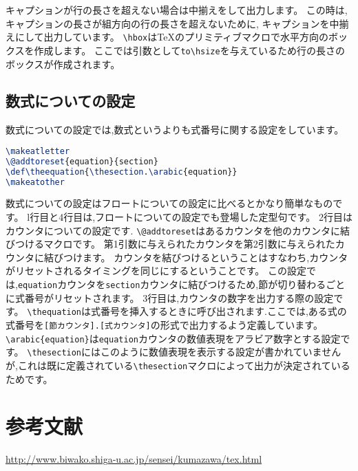 キャプションが行の長さを超えない場合は中揃えをして出力します。
この時は,キャプションの長さが組方向の行の長さを超えないために,
キャプションを中揃えにして出力しています。
\verb|\hbox|は{\TeX}のプリミティブマクロで水平方向のボックスを作成します。
ここでは引数として\verb|to\hsize|を与えているため行の長さのボックスが作成されます。

\subsection{数式についての設定}

数式についての設定では,数式というよりも式番号に関する設定をしています。
\begin{lstlisting}[caption = 数式についての設定, label = list:eq, language = tex]
\makeatletter
\@addtoreset{equation}{section}
\def\theequation{\thesection.\arabic{equation}}
\makeatother
\end{lstlisting}

数式についての設定はフロートについての設定に比べるとかなり簡単なものです。
l行目と4行目は,フロートについての設定でも登場した定型句です。
2行目はカウンタについての設定です. \verb|\@addtoreset|はあるカウンタを他のカウンタに結びつけるマクロです。
第1引数に与えられたカウンタを第2引数に与えられたカウンタに結びつけます。
カウンタを結びつけるということはすなわち,カウンタがリセットされるタイミングを同じにするということです。
この設定では,\verb|equation|カウンタを\verb|section|カウンタに結びつけるため,節が切り替わるごとに式番号がリセットされます。
3行目は,カウンタの数字を出力する際の設定です。
\verb|\thequation|は式番号を挿入するときに呼び出されます.ここでは,ある式の式番号を\verb|[節カウンタ].[式カウンタ]|の形式で出力するよう定義しています。
\verb|\arabic{equation}|は\verb|equation|カウンタの数値表現をアラビア数字とする設定です。
\verb|\thesection|にはこのように数値表現を表示する設定が書かれていませんが,これは既に定義されている\verb|\thesection|マクロによって出力が決定されているためです。


\section*{参考文献}
\url{http://www.biwako.shiga-u.ac.jp/sensei/kumazawa/tex.html}
